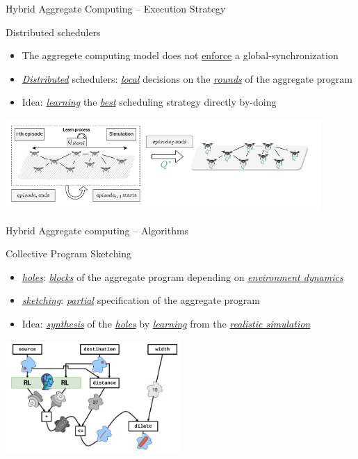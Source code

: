 \documentclass[presentation, 9pt,169]{beamer}\mode<presentation>{\usetheme{AMSBolognaFC}}
\begin{document}
\begin{frame}{Hybrid Aggregate Computing -- Execution Strategy}
  \begin{exampleblock}{Distributed schedulers~\cite{DBLP:conf/acsos/AguzziCV22}}
    \begin{itemize}
      \item The aggregete computing model does not \underline{enforce} a global-synchronization
      \item \emph{\underline{Distributed}} schedulers: \emph{\underline{local}} decisions on the \emph{\underline{rounds}} of the aggregate program
      \item Idea: \emph{\underline{learning}} the \emph{\underline{best}} scheduling strategy directly by-doing
    \end{itemize}
    \begin{center}
    \includegraphics[width=0.9\textwidth]{img/algorithm-learning.png}
    \end{center}
  \end{exampleblock}
\end{frame}
\begin{frame}{Hybrid Aggregate computing -- Algorithms}
  \begin{exampleblock}{Collective Program Sketching~\cite{DBLP:conf/coordination/AguzziCV22}}
    \begin{itemize}
      \item \emph{\underline{holes}}: \emph{\underline{blocks}} of the aggregate program depending on \emph{\underline{environment dynamics}}
      \item \emph{\underline{sketching}}: \emph{\underline{partial}} specification of the aggregate program
      \item Idea: \emph{\underline{synthesis}} of the \emph{\underline{holes}} by \emph{\underline{learning}} from the \emph{\underline{realistic simulation}}
    \end{itemize}
    \begin{center}
    \includegraphics[width=0.5\textwidth]{img/synthesis-3.png}
    \end{center}
  \end{exampleblock}
\end{frame}
\end{document}
